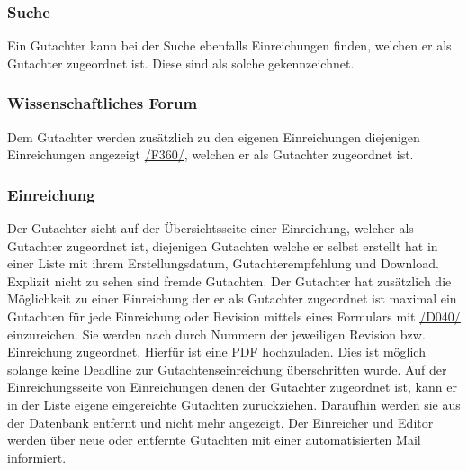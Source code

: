 \subsubsection{Suche}
\begin{description}
     Ein Gutachter kann bei der Suche ebenfalls Einreichungen finden, welchen er als Gutachter
    zugeordnet ist. Diese sind als solche gekennzeichnet.
\end{description}

\subsubsection{Wissenschaftliches Forum}
\begin{description}
     Dem Gutachter werden zusätzlich zu den eigenen Einreichungen diejenigen Einreichungen angezeigt
    \hyperref[funkt:360]{/F360/}, welchen er als Gutachter zugeordnet ist.
\end{description}

\subsubsection{Einreichung}\label{gut:ein}
\begin{description}
     Der Gutachter sieht auf der Übersichtsseite einer Einreichung, welcher als Gutachter
    zugeordnet ist, diejenigen Gutachten welche er selbst erstellt hat in einer
    Liste mit ihrem Erstellungsdatum, Gutachterempfehlung und Download. Explizit nicht zu sehen sind fremde Gutachten.
     Der Gutachter hat zusätzlich die Möglichkeit zu einer Einreichung der er als Gutachter zugeordnet ist
    maximal ein Gutachten für jede Einreichung oder Revision mittels eines Formulars mit \hyperref[d040]{/D040/} einzureichen.
    Sie werden nach durch Nummern der jeweiligen Revision bzw. Einreichung zugeordnet.
    Hierfür ist eine PDF hochzuladen. Dies ist möglich solange keine Deadline zur Gutachtenseinreichung überschritten wurde.
     Auf der Einreichungsseite von Einreichungen denen der Gutachter zugeordnet ist,
    kann er in der Liste eigene eingereichte Gutachten zurückziehen.
    Daraufhin werden sie aus der Datenbank entfernt und nicht mehr angezeigt.
     Der Einreicher und Editor werden über neue oder entfernte Gutachten mit einer automatisierten
    Mail informiert.
\end{description}

